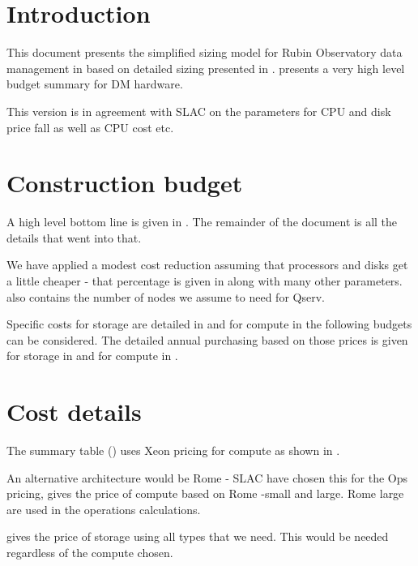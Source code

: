 \section{Introduction}
This document presents the simplified
  sizing model for Rubin Observatory data management  in  based on detailed sizing presented in .
 presents a very high level budget summary for
DM hardware.

This version is in agreement with SLAC on the parameters for CPU and disk price fall as well as CPU cost etc.

\section{Construction  budget}\label{sec:cost}

A high level bottom line is given in .
The remainder of the document is all the details that went into that.



We have applied a modest cost reduction assuming that processors  and disks get a little cheaper - that
percentage is given in  along with many other parameters.  also contains the number of nodes we assume to need for Qserv.

Specific  costs for storage are detailed in  and for compute in 
the following budgets can be considered. The detailed annual purchasing based on those prices is given for
storage in  and for compute in .





\section{Cost details}
The summary table ()  uses Xeon pricing for compute as shown in
.


An alternative architecture would be Rome - SLAC have chosen this for the Ops pricing,  gives the price of compute based on Rome -small and large.
Rome large are used in the operations calculations.


 gives the price of storage using all  types that we need.
This would be needed regardless of the compute chosen.


